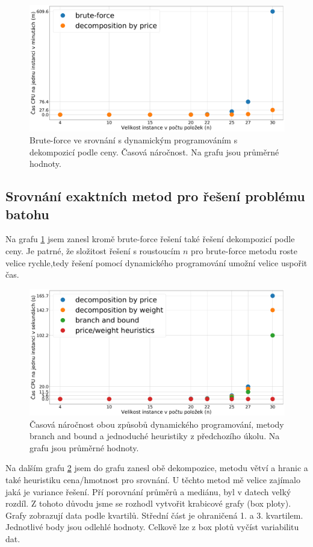 \documentclass[11pt]{article}
\begin{document}
\begin{figure}[h]\centering
	\includegraphics[scale=0.2]{img/tBavg}
 	\caption[1]{Brute-force ve srovnání s dynamickým programováním s dekompozicí podle ceny. Časová náročnost. Na grafu jsou průměrné hodnoty.}\label{fig:1}
 \end{figure} 	

\subsection{Srovnání exaktních metod pro řešení problému batohu}
Na grafu \ref{fig:1} jsem zanesl kromě brute-force řešení také řešení dekompozicí podle ceny. Je patrné, že složitost řešení s roustoucím $n$ pro brute-force metodu roste velice rychle,tedy řešení pomocí dynamického programování umožní velice uspořit čas. 


\begin{figure}[h]\centering
	\includegraphics[scale=0.2]{img/tDavg}
 	\caption[2]{Časová náročnost obou způsobů dynamického programování, metody branch and bound a jednoduché heuristiky z předchozího úkolu. Na grafu jsou průměrné hodnoty.}\label{fig:2}
 \end{figure} 	
 

Na dalším grafu \ref{fig:2} jsem do grafu zanesl obě dekompozice, metodu větví a hranic a také heuristiku cena/hmotnost pro srovnání. 
U těchto metod mě velice zajímalo jaká je variance řešení. Pří porovnání průměrů a mediánu, byl v datech velký rozdíl. Z tohoto důvodu jsme se rozhodl vytvořit krabicové grafy (box ploty). Grafy zobrazují data podle kvartilů. Střední část je ohraničená 1. a 3. kvartilem. Jednotlivé body jsou odlehlé hodnoty. Celkově lze z box plotů vyčíst variabilitu dat. 
\end{document}
